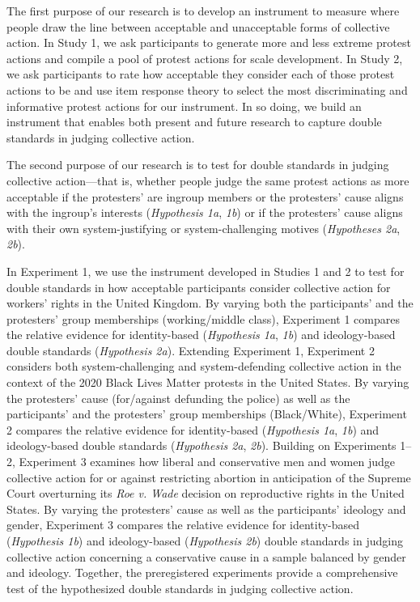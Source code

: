 \documentclass[12pt, letterpaper]{article}
\begin{document}
The first purpose of our research is to develop an instrument to measure
where people draw the line between acceptable and unacceptable forms of
collective action. In Study 1, we ask participants to generate more and
less extreme protest actions and compile a pool of protest actions for
scale development. In Study 2, we ask participants to rate how
acceptable they consider each of those protest actions to be and use
item response theory to select the most discriminating and informative
protest actions for our instrument. In so doing, we build an instrument
that enables both present and future research to capture double
standards in judging collective action.

The second purpose of our research is to test for double standards in
judging collective action---that is, whether people judge the same
protest actions as more acceptable if the protesters' are ingroup
members or the protesters' cause aligns with the ingroup's interests
(\emph{Hypothesis 1a}, \emph{1b}) or if the protesters' cause aligns
with their own system-justifying or system-challenging motives
(\emph{Hypotheses 2a}, \emph{2b}).

In Experiment 1, we use the instrument developed in Studies 1 and 2 to
test for double standards in how acceptable participants consider
collective action for workers' rights in the United Kingdom. By varying
both the participants' and the protesters' group memberships
(working/middle class), Experiment 1 compares the relative evidence for
identity-based (\emph{Hypothesis 1a}, \emph{1b}) and ideology-based
double standards (\emph{Hypothesis 2a}). Extending Experiment 1,
Experiment 2 considers both system-challenging and system-defending
collective action in the context of the 2020 Black Lives Matter protests
in the United States. By varying the protesters' cause (for/against
defunding the police) as well as the participants' and the protesters'
group memberships (Black/White), Experiment 2 compares the relative
evidence for identity-based (\emph{Hypothesis 1a}, \emph{1b}) and
ideology-based double standards (\emph{Hypothesis 2a}, \emph{2b}).
Building on Experiments 1--2, Experiment 3 examines how liberal and
conservative men and women judge collective action for or against
restricting abortion in anticipation of the Supreme Court overturning
its \emph{Roe v. Wade} decision on reproductive rights in the United
States. By varying the protesters' cause as well as the participants'
ideology and gender, Experiment 3 compares the relative evidence for
identity-based (\emph{Hypothesis 1b}) and ideology-based
(\emph{Hypothesis 2b}) double standards in judging collective action
concerning a conservative cause in a sample balanced by gender and
ideology. Together, the preregistered experiments provide a
comprehensive test of the hypothesized double standards in judging
collective action.
\end{document}
